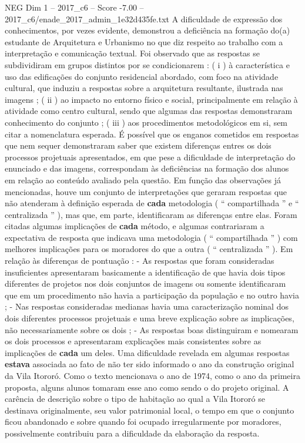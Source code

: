 \begin{textsample}{NEG Dim 1 – 2017\_c6 – Score -7.00 – 2017\_c6/enade\_2017\_admin\_1e32d435fe.txt}
A dificuldade de expressão dos conhecimentos, por vezes evidente, demonstrou a deficiência na formação do(a) estudante de Arquitetura e Urbanismo no que diz respeito ao trabalho com a interpretação e comunicação textual.
Foi observado que as respostas se subdividiram em grupos distintos por se condicionarem : ( i ) à característica e uso das edificações do conjunto residencial abordado, com foco na atividade cultural, que induziu a respostas sobre a arquitetura resultante, ilustrada nas imagens ; ( ii ) ao impacto no entorno físico e social, principalmente em relação à atividade como centro cultural, sendo que algumas das respostas demonstraram conhecimento do conjunto ; ( iii ) aos procedimentos metodológicos em si, sem citar a nomenclatura esperada.
É possível que os enganos cometidos em respostas que nem sequer demonstraram saber que existem diferenças entres os dois processos projetuais apresentados, em que pese a dificuldade de interpretação do enunciado e das imagens, correspondam às deficiências na formação dos alunos em relação ao conteúdo avaliado pela questão.
Em função das observações já mencionadas, houve um conjunto de interpretações que geraram respostas que não atenderam à definição esperada de \textbf{cada} metodologia ( “ compartilhada ” e “ centralizada ” ), mas que, em parte, identificaram as diferenças entre elas.
Foram citadas algumas implicações de \textbf{cada} método, e algumas contrariaram a expectativa de resposta que indicava uma metodologia ( “ compartilhada ” ) com melhores implicações para os moradores do que a outra ( “ centralizada ” ).
Em relação às diferenças de pontuação : - As respostas que foram consideradas insuficientes apresentaram basicamente a identificação de que havia dois tipos diferentes de projetos nos dois conjuntos de imagens ou somente identificaram que em um procedimento não havia a participação da população e no outro havia ; - Nas respostas consideradas medianas havia uma caracterização nominal dos dois diferentes processos projetuais e uma breve explicação sobre as implicações, não necessariamente sobre os dois ; - As respostas boas distinguiram e nomearam os dois processos e apresentaram explicações mais consistentes sobre as implicações de \textbf{cada} um deles.
Uma dificuldade revelada em algumas respostas \textbf{estava} associada ao fato de não ter sido informado o ano da construção original da Vila Itororó.
Como o texto mencionava o ano de 1974, como o ano da primeira proposta, alguns alunos tomaram esse ano como sendo o do projeto original.
A carência de descrição sobre o tipo de habitação ao qual a Vila Itororó se destinava originalmente, seu valor patrimonial local, o tempo em que o conjunto ficou abandonado e sobre quando foi ocupado irregularmente por moradores, possivelmente contribuiu para a dificuldade da elaboração da resposta.

\end{textsample}
